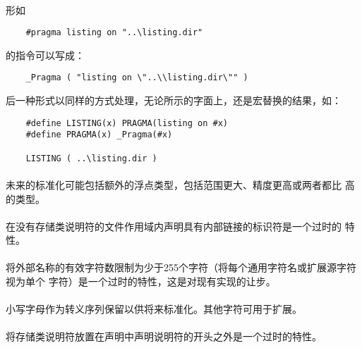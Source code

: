 {\paragraph{}
\ex* 形如
\begin{lstlisting}
    #pragma listing on "..\listing.dir"
\end{lstlisting}
的指令可以写成：
\begin{lstlisting}
    _Pragma ( "listing on \"..\\listing.dir\"" )
\end{lstlisting}
后一种形式以同样的方式处理，无论所示的字面上，还是宏替换的结果，如：
\begin{lstlisting}
    #define LISTING(x) PRAGMA(listing on #x)
    #define PRAGMA(x) _Pragma(#x)

    LISTING ( ..\listing.dir )
\end{lstlisting}

\paragraph{}
未来的标准化可能包括额外的浮点类型，包括范围更大、精度更高或两者都比
高的类型。

\paragraph{}
在没有存储类说明符的文件作用域内声明具有内部链接的标识符是一个过时的
特性。

\paragraph{}
将外部名称的有效字符数限制为少于255个字符（将每个通用字符名或扩展源字符视为单个
字符）是一个过时的特性，这是对现有实现的让步。

\paragraph{}
小写字母作为转义序列保留以供将来标准化。其他字符可用于扩展。

\paragraph{}
将存储类说明符放置在声明中声明说明符的开头之外是一个过时的特性。

}
